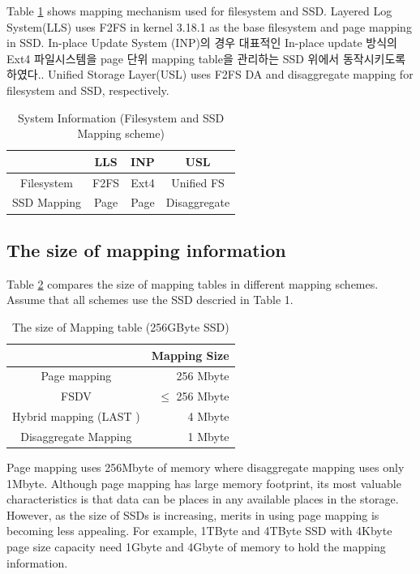 \documentclass[letterpaper,twocolumn,10pt]{article}
\begin{document}
Table \ref{tab:system_info} shows mapping mechanism used for filesystem and SSD. Layered Log System(LLS) uses F2FS in kernel 3.18.1 as the base filesystem and page mapping in SSD. In-place Update System (INP)의 경우 대표적인 In-place update 방식의 Ext4 파일시스템을 page 단위 mapping table을 관리하는 SSD 위에서 동작시키도록 하였다.. Unified Storage Layer(USL) uses F2FS DA and disaggregate mapping for filesystem and SSD, respectively.

\begin{table}[h]
\begin{center}
\begin{tabular}{|c|c|c|c|} \hline
				& LLS	& INP	& USL 				\\ \hline\hline
Filesystem		& F2FS	& Ext4	& Unified FS			\\ \hline
SSD Mapping		& Page	& Page	& Disaggregate		\\ \hline
\end{tabular}
\end{center}
\caption{System Information (Filesystem and SSD Mapping scheme)}
\label{tab:system_info}
\end{table}


\subsection{The size of mapping information}

Table \ref{tab:meta_size} compares the size of mapping tables in different mapping schemes. Assume that all schemes use the SSD descried in Table 1. 

\begin{table}[h]
\begin{center}
\begin{tabular}{|c|r|} \hline
									& Mapping Size	\\ \hline\hline
Page mapping							& 256 Mbyte		\\ \hline
FSDV\cite{zhangremoving}				& $\leq$	256 Mbyte		\\ \hline
Hybrid mapping (LAST \cite{last08})		& 4 Mbyte			\\ \hline
Disaggregate Mapping 					& 1 Mbyte			\\ \hline
\end{tabular}
\end{center}
\caption{The size of Mapping table (256GByte SSD)}
\label{tab:meta_size}
\end{table}

Page mapping uses 256Mbyte of memory where disaggregate mapping uses only 1Mbyte. Although page mapping has large memory footprint, its most valuable characteristics is that data can be places in any available places in the storage. However, as the size of SSDs is increasing, merits in using page mapping is becoming less appealing. For example, 1TByte and 4TByte SSD with 4Kbyte page size capacity need 1Gbyte and 4Gbyte of memory to hold the mapping information.
\end{document}
